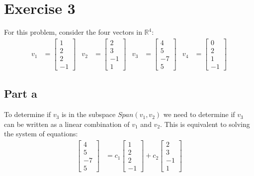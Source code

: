 \section{Exercise 3}
For this problem, consider the four vectors in $\mathbb{R}^4$:
\begin{align*}
	v_1 & = \begin{bmatrix}1\\2\\2\\-1\end{bmatrix}
	    & v_2                                       & = \begin{bmatrix}2\\3\\-1\\1\end{bmatrix}
	    & v_3                                       & = \begin{bmatrix}4\\5\\-7\\5\end{bmatrix}
	    & v_4                                       & = \begin{bmatrix}0\\2\\1\\-1\end{bmatrix}
\end{align*}

\subsection{Part a}

To determine if $v_3$ is in the subspace $Span({v_1, v_2})$ we need to determine if $v_3$ can be written as a linear combination of $v_1$ and $v_2$. This is equivalent to solving the system of equations:
\begin{align*}
	\begin{bmatrix}4\\5\\-7\\5\end{bmatrix} & = c_1\begin{bmatrix}1\\2\\2\\-1\end{bmatrix} + c_2\begin{bmatrix}2\\3\\-1\\1\end{bmatrix}
\end{align*}

